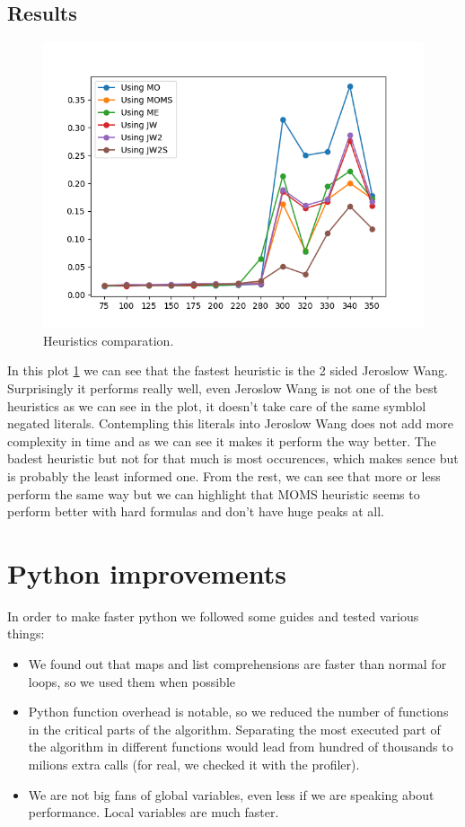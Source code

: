 \documentclass{article}
\begin{document}
\subsection{Results}
\begin{figure}[H]
  \includegraphics[width=\linewidth]{../utils/plots/heuristics.png}
  \caption{Heuristics comparation.}
  \label{fig:heu}
\end{figure}
In this plot \ref{fig:heu} we can see that the fastest heuristic is the 2 sided Jeroslow Wang. Surprisingly it performs really well, even Jeroslow Wang is not one of the best heuristics as we can see in the plot, it doesn't take care of the same symblol negated literals. Contempling this literals into Jeroslow Wang does not add more complexity in time and as we can see it makes it perform the way better.
The badest heuristic but not for that much is most occurences, which makes sence but is probably the least informed one. 
From the rest, we can see that more or less perform the same way but we can highlight that MOMS heuristic seems to perform better with hard formulas and don't have huge peaks at all.
\section{Python improvements}
In order to make faster python we followed some guides and tested various things:
\begin{itemize}
	\item We found out that maps and list comprehensions are faster than normal for loops, so we used
	them when possible
	\item Python function overhead is notable, so we reduced the number of functions in the critical
	parts of the algorithm. Separating the most executed part of the algorithm in different functions 
	would lead from hundred of thousands to milions extra calls (for real, we checked it with the
	profiler).
	\item We are not big fans of global variables, even less if we are speaking about performance. Local
	variables are much faster.
\end{itemize} 
%
\end{document}
